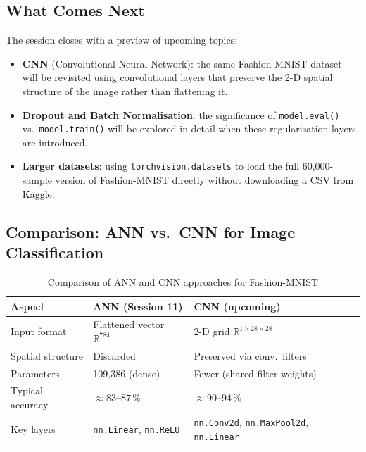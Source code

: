 \documentclass[12pt,a4paper]{article}
\begin{document}
\subsection{What Comes Next}

The session closes with a preview of upcoming topics:

\begin{itemize}
  \item \textbf{CNN} (Convolutional Neural Network): the same Fashion-MNIST
        dataset will be revisited using convolutional layers that preserve
        the 2-D spatial structure of the image rather than flattening it.
  \item \textbf{Dropout and Batch Normalisation}: the significance of
        \texttt{model.eval()} vs.\ \texttt{model.train()} will be explored
        in detail when these regularisation layers are introduced.
  \item \textbf{Larger datasets}: using \texttt{torchvision.datasets} to
        load the full 60{,}000-sample version of Fashion-MNIST directly
        without downloading a CSV from Kaggle.
\end{itemize}

\subsection{Comparison: ANN vs.\ CNN for Image Classification}

\begin{table}[htbp]
  \centering
  \caption{Comparison of ANN and CNN approaches for Fashion-MNIST}
  \label{tab:ann-vs-cnn}
  \begin{tabularx}{\linewidth}{lXX}
    \toprule
    \textbf{Aspect} & \textbf{ANN (Session 11)} & \textbf{CNN (upcoming)} \\
    \midrule
    Input format & Flattened vector $\mathbb{R}^{784}$ &
      2-D grid $\mathbb{R}^{1 \times 28 \times 28}$ \\
    Spatial structure & Discarded & Preserved via conv.\ filters \\
    Parameters & 109{,}386 (dense) &
      Fewer (shared filter weights) \\
    Typical accuracy & $\approx 83\text{--}87\,\%$ &
      $\approx 90\text{--}94\,\%$ \\
    Key layers & \texttt{nn.Linear}, \texttt{nn.ReLU} &
      \texttt{nn.Conv2d}, \texttt{nn.MaxPool2d}, \texttt{nn.Linear} \\
    \bottomrule
  \end{tabularx}
\end{table}
\end{document}
